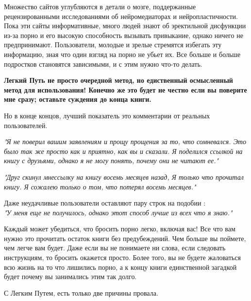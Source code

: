 \documentclass[
]{book}
\begin{document}
Множество сайтов углубляются в детали о мозге, поддержанные рецензированными исследованиями об нейромедиаторах и нейропластичности. Пока эти сайты информативные, много людей знают об эректильной дисфункции из-за порно и его высокую способность вызывать привыкание, однако ничего не предпринимают. Пользователи, молодые и зрелые стремятся избегать эту информацию, зная что один взгляд на порно не убьет их. Все больше и больше подростков становятся зависимыми, и с этим нужно что-то делать.

\textbf{Легкий Путь не просто очередной метод, но едиственный осмысленный метод для использования! Конечно же это будет не честно если вы поверите мне сразу; оставьте суждения до конца книги.}

Но в конце концов, лучший показатель это комментарии от реальных пользователей.

\emph{"Я не поверил вашим заявлениям и прощу прощения за то, что сомневался. Это было так же просто как и приятно, как вы и сказали. Я поделился ссылкой на книгу с друзьями, однако я не могу понять, почему они не читают ее."}

\emph{"Друг скинул мнессылку на книгу восемь месяцев назад, Я только что прочитал книгу. Я сожалею только о том, что потерял восемь месяцев."}

Даже неудачливые пользователи оставляют пару строк на подобии :\\
\emph{"У меня еще не получилось, однако этот способ лучше из всех что я знаю."}

Каждый может убедиться, что бросить порно легко, включая вас! Все что вам нужно это прочитать остаток книги без предубеждений. Чем больше вы поймете, чем легче вам будет. Даже если вы не понимаете ни слова, если следовать инструкциям, то бросить окажется просто. Более того, вы не будете жаловаться всю жизнь на то что лишились порно, а к концу книги единственной загадкой будет почему вы занимались этим так долго.

С Легким Путем, есть только две причины провала.
\end{document}
